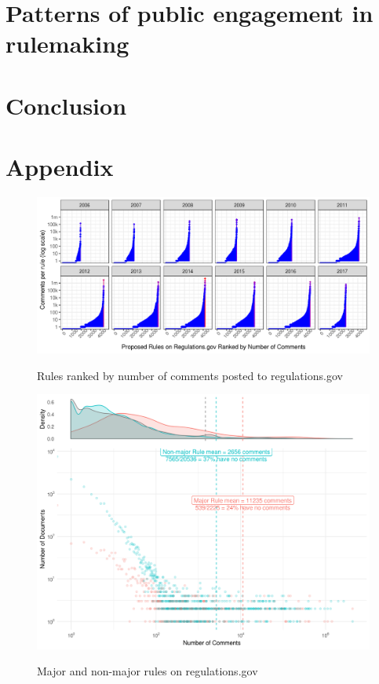 \documentclass{article}
\begin{document}
\section{Patterns of public engagement in rulemaking}
\label{whyMail-results}


\section{Conclusion}


\newpage
\section{Appendix}


\begin{figure}[h!]
    \centering
        \caption{Rules ranked by number of comments posted to regulations.gov}
    \includegraphics[width = 6.5in]{Figs/rules-ranked-comments-per-year-1.png}
    \label{fig:rules-ranked}
\end{figure}

\begin{figure}[p!]
    \centering
        \caption{Major and non-major rules on regulations.gov}
    \includegraphics[width = 7in]{Figs/major-comments-density-1.png}
    \label{fig:rules-major}
\end{figure}
\end{document}
